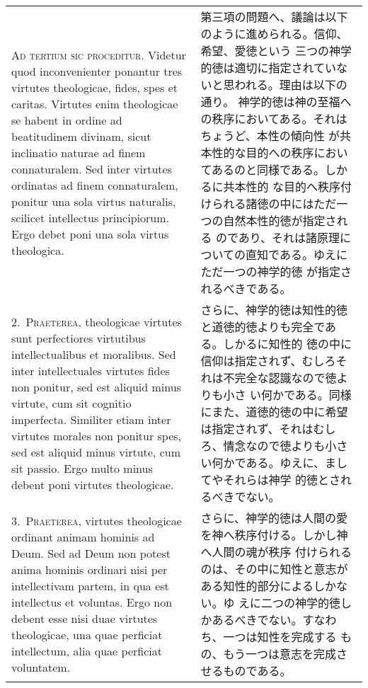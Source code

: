 \documentclass[10pt]{jsarticle}
\begin{document}
\begin{longtable}{p{21em}p{21em}}

{\scshape Ad tertium sic proceditur}. Videtur quod inconvenienter
ponantur tres virtutes theologicae, fides, spes et caritas. Virtutes
enim theologicae se habent in ordine ad beatitudinem divinam, sicut
inclinatio naturae ad finem connaturalem. Sed inter virtutes ordinatas
ad finem connaturalem, ponitur una sola virtus naturalis, scilicet
intellectus principiorum. Ergo debet poni una sola virtus theologica.


&

 第三項の問題へ、議論は以下のように進められる。信仰、希望、愛徳という
 三つの神学的徳は適切に指定されていないと思われる。理由は以下の通り。
 神学的徳は神の至福への秩序においてある。それはちょうど、本性の傾向性
 が共本性的な目的への秩序においてあるのと同様である。しかるに共本性的
 な目的へ秩序付けられる諸徳の中にはただ一つの自然本性的徳が指定される
 のであり、それは諸原理についての直知である。ゆえにただ一つの神学的徳
 が指定されるべきである。
 
\\



2.~{\scshape Praeterea}, theologicae virtutes sunt perfectiores
virtutibus intellectualibus et moralibus. Sed inter intellectuales
virtutes fides non ponitur, sed est aliquid minus virtute, cum sit
cognitio imperfecta. Similiter etiam inter virtutes morales non
ponitur spes, sed est aliquid minus virtute, cum sit passio. Ergo
multo minus debent poni virtutes theologicae.

&

 さらに、神学的徳は知性的徳と道徳的徳よりも完全である。しかるに知性的
 徳の中に信仰は指定されず、むしろそれは不完全な認識なので徳よりも小さ
 い何かである。同様にまた、道徳的徳の中に希望は指定されず、それはむし
 ろ、情念なので徳よりも小さい何かである。ゆえに、ましてやそれらは神学
 的徳とされるべきでない。
 
\\



3.~{\scshape Praeterea}, virtutes theologicae ordinant animam hominis
ad Deum. Sed ad Deum non potest anima hominis ordinari nisi per
intellectivam partem, in qua est intellectus et voluntas. Ergo non
debent esse nisi duae virtutes theologicae, una quae perficiat
intellectum, alia quae perficiat voluntatem.


&

 さらに、神学的徳は人間の愛を神へ秩序付ける。しかし神へ人間の魂が秩序
 付けられるのは、その中に知性と意志がある知性的部分によるしかない。ゆ
 えに二つの神学的徳しかあるべきでない。すなわち、一つは知性を完成する
 もの、もう一つは意志を完成させるものである。
 

\end{longtable}
\end{document}
